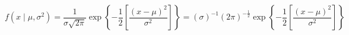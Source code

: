 \begin{equation}
	f
	\left(
	x
	\mid
	\mu,
	\sigma^2
	\right)
	=
	\frac{
		1
		}{
		\sigma
		\sqrt{
			2 
			\pi
		}
	}
	\exp
	\left\{
	-
	\frac{1}{2}
	\left[
	\frac{
		\left( 
		x 
		- 
		\mu 
		\right)^2
	}
	{
		\sigma^2
	}
	\right]
	\right\}
	=
	\left(
	\sigma
	\right)^{-1}
	\left(
	2
	\pi
	\right)^{
	-
	\frac{
	1
	}{
	2
	}
	}
	\exp
	\left\{
	-
	\frac{1}{2}
	\left[
	\frac{
		\left( 
		x 
		- 
		\mu 
		\right)^2
	}
	{
		\sigma^2
	}
	\right]
	\right\}
	\label{eq:multiNorm-n-pdf}
\end{equation}